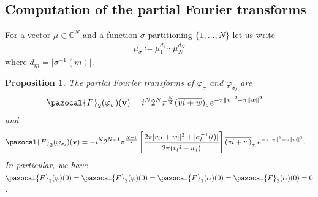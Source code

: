 \documentclass[a4paper,11pt]{amsart} %
\newcommand{\8}{\infty}
\newcommand{\vbf}{\mathbf{v}}
\newcommand{\four}{\pazocal{F}}
\newcommand{\C}{\mathbb{C}}
\theoremstyle{mytheoremstyle}
\newtheorem{prop}[thm]{Proposition}
\theoremstyle{remark}
\numberwithin{equation}{section}
\begin{document}
\subsection{Computation of the partial Fourier transforms} %
For a vector $\mu \in \C^N$ and a function $\sigma$ partitioning $\{1,\dots,N\}$ let us write
\begin{align}
\mu_\sigma \coloneqq \mu_1^{d_1} \cdots \mu_N^{d_N}   
\end{align}
where $d_m=\vert\sigma^{-1}(m)\vert$.
\begin{prop} \label{phisigma}
    The partial Fourier transforms of $\varphi_\sigma$ and $\varphi_{\sigma_l}$ are
\begin{align}
    \four_2(\varphi_\sigma)(\vbf)& =i^N 2^N \pi^\frac{N}{2} (\overline{vi+w})_\sigma e^{-\pi  \lVert v\rVert^2-\pi \lVert w \rVert^2}
 \end{align}
 and
 \begin{align}
   \four_2( \varphi_{\sigma_l})(\vbf)& =-i^{N}2^{N-1} \pi^{\frac{N-1}{2}} \left [ \frac{2\pi \vert v_li+w_l \vert ^2+\vert \sigma_l^{-1}(l) \vert}{2\pi\overline{(v_li+w_l)}}\right ] \overline{(vi+w)}_{\sigma_l}e^{-\pi  \lVert v\rVert^2-\pi \lVert w \rVert^2}.
\end{align}
In particular, we have $\four_1(\varphi)(0)=\four_2(\varphi)(0)=\four_1(\alpha)(0)=\four_2(\alpha)(0)=0$.
\end{prop}
\end{document}
